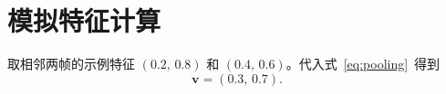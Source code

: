 \chapter{模拟特征计算}

取相邻两帧的示例特征 \((0.2,\,0.8)\) 和 \((0.4,\,0.6)\)。代入式~\eqref{eq:pooling}~得到
\begin{equation}
  \mathbf{v} = (0.3,\,0.7).
\end{equation}
